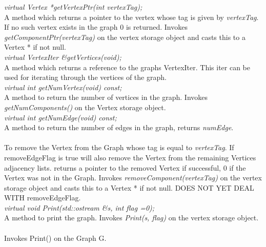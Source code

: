 {\em virtual Vertex *getVertexPtr(int vertexTag);} \\
A method which returns a pointer to the vertex whose tag is given by {\em
vertexTag}. If no such vertex exists in the graph $0$ is
returned. Invokes {\em getComponentPtr(vertexTag)} on the vertex
storage object and casts this to a Vertex * if not null. \\

{\em virtual VertexIter \&getVertices(void);} \\
A method which returns a reference to the graphs VertexIter. This iter
can be used for iterating through the vertices of the graph. \\

{\em virtual int getNumVertex(void) const;} \\
A method to return the number of vertices in the graph. Invokes {\em
getNumComponents()} on the Vertex storage object.\\

{\em virtual int getNumEdge(void) const;} \\
A method to return the number of edges in the graph, returns {\em
numEdge}. \\ 

 \\
To remove the Vertex from the Graph whose tag is equal to {\em
vertexTag}. If \p removeEdgeFlag is \p true will also remove the
Vertex from the remaining Vertices adjacency lists. returns a pointer
to the removed Vertex if successful, $0$ if the Vertex was not in the
Graph. Invokes {\em removeComponent(vertexTag)} on the vertex
storage object and casts this to a Vertex * if not null. DOES NOT YET
DEAL WITH \p removeEdgeFlag. \\

{\em virtual void Print(std::ostream \&s, int flag =0);} \\
A method to print the graph. Invokes {\em Print(s, flag)} on the vertex
storage object. \\

 \\
Invokes Print() on the Graph \p G.
